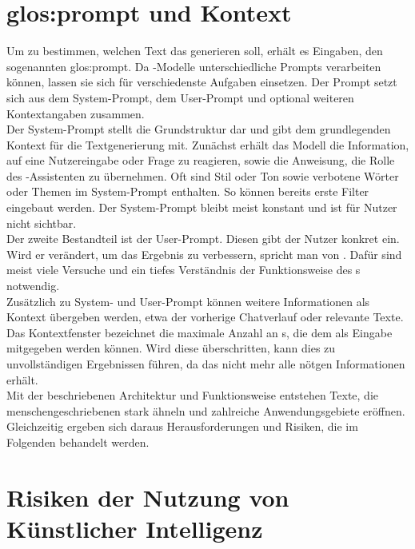 \documentclass[../main.tex]{subfiles}
\begin{document}
\section{\gls{glos:prompt} und Kontext}

Um zu bestimmen, welchen Text das  generieren soll, erhält es Eingaben, den sogenannten \gls{glos:prompt}. Da -Modelle unterschiedliche Prompts 
verarbeiten können, lassen sie sich für verschiedenste Aufgaben einsetzen. Der Prompt setzt sich aus dem System-Prompt, dem User-Prompt und optional weiteren Kontextangaben zusammen.\cite{systemprompt}\\
Der System-Prompt stellt die Grundstruktur dar und gibt dem  grundlegenden Kontext für die Textgenerierung mit. Zunächst erhält das Modell die Information, auf eine 
Nutzereingabe oder Frage zu reagieren, sowie die Anweisung, die Rolle des -Assistenten zu übernehmen. Oft sind Stil oder Ton sowie verbotene Wörter oder Themen im System-Prompt 
enthalten. So können bereits erste Filter eingebaut werden.\cite{systemprompt} Der System-Prompt bleibt meist konstant und ist für Nutzer nicht sichtbar.\\
Der zweite Bestandteil ist der User-Prompt. Diesen gibt der Nutzer konkret ein. Wird er verändert, um das Ergebnis zu verbessern, spricht man von  . 
Dafür sind meist viele Versuche und ein tiefes Verständnis der Funktionsweise des s notwendig.\cite{promptengineering}\\
Zusätzlich zu System- und User-Prompt können weitere Informationen als Kontext übergeben werden, etwa der vorherige Chatverlauf oder relevante Texte. 
Das Kontextfenster bezeichnet die maximale Anzahl an s, die dem  als Eingabe mitgegeben werden können. Wird diese überschritten, kann dies zu unvollständigen 
Ergebnissen führen, da das  nicht mehr alle nötgen Informationen erhält.\\
Mit der beschriebenen Architektur und Funktionsweise entstehen Texte, die menschengeschriebenen stark ähneln und zahlreiche Anwendungsgebiete eröffnen. Gleichzeitig ergeben sich daraus Herausforderungen und Risiken, 
die im Folgenden behandelt werden.

\section{Risiken der Nutzung von Künstlicher Intelligenz}
\end{document}
